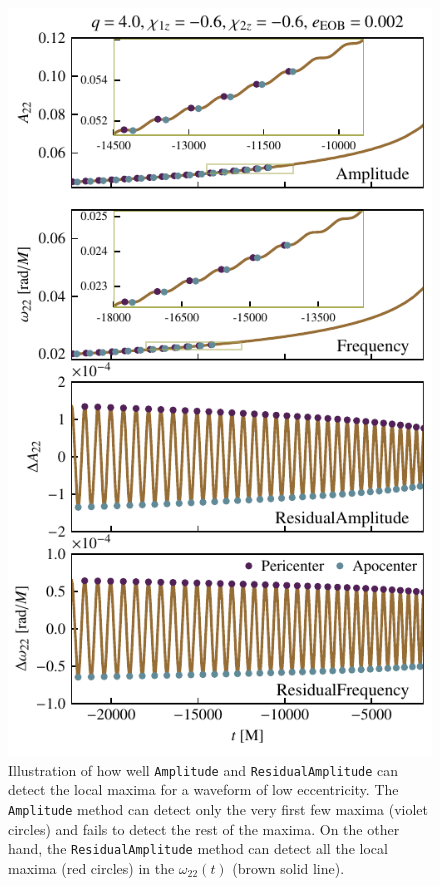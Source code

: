 \documentclass[aps,prd,amsmath,floats,floatfix, twocolumn,
superscriptaddress,nofootinbib,showpacs]{revtex4-1}
\newcommand{\mAmp}{\texttt{Amplitude}}
\newcommand{\mResAmp}{\texttt{ResidualAmplitude}}
\begin{document}
\begin{figure}[thb]
  \centering
  \includegraphics[width=\columnwidth]{compare_methods}
  \caption{Illustration of how well \mAmp{} and \mResAmp{} can detect
the local maxima for a waveform of low eccentricity. The \mAmp{}
method can detect only the very first few maxima (violet circles) and
fails to detect the rest of the maxima. On the other hand, the
\mResAmp{} method can detect all the local maxima (red circles) in the
$\omega_{22}(t)$ (brown solid line).}
  \label{fig:amp_vs_res_amp}
\end{figure}
\end{document}
